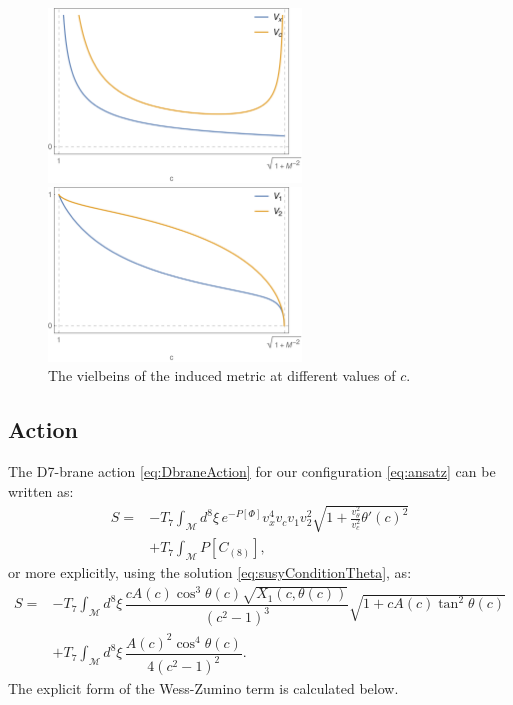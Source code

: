 \begin{figure}[t!]
\begin{center}
\includegraphics[width=0.6\textwidth]{pictures/vxvc.png}
\end{center}
\vspace{0.05mm}
\begin{center}
\includegraphics[width=0.6\textwidth]{pictures/v1v2.png}
\end{center}
\caption{\label{fig:vielbeins} The vielbeins of the induced metric at different values of $c$.}
\end{figure}



\subsection{Action}


The D7-brane action \eqref{eq:DbraneAction} for our configuration \eqref{eq:ansatz} can be written as:
\begin{align}
 S  = & -T_7 \int_\mathcal{M} d^8\xi \, e^{-P[\Phi] } v_x^4 v_c v_1 v_2^2 \sqrt{1+\frac{v_\theta^2}{v_c^2}\theta'(c)^2}  \nonumber \\
      & + T_7\int _\mathcal{M} P[C_{(8)}],
\end{align}
or more explicitly, using the solution \eqref{eq:susyConditionTheta}, as:
\begin{align}\label{eq:ActionWithTheta}
 S = & -T_7 \int_\mathcal{M} d^8\xi \, \dfrac{c A(c) \cos^3\theta (c) \sqrt{X_1(c, \theta(c))}}{\left(c^2-1\right)^3} \sqrt{1+ c A(c) \tan^2\theta(c)} \nonumber \\
     & +T_7\int _\mathcal{M} d^8\xi \, \dfrac{A(c)^2 \cos^4\theta(c)}{4 \left(c^2-1\right)^2}.
\end{align}
The explicit form of the Wess-Zumino term is calculated below.


